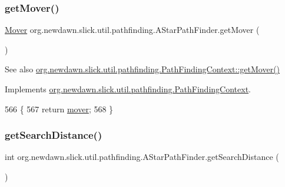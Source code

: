 \subsubsection{\texorpdfstring{get\+Mover()}{getMover()}}
{\footnotesize\ttfamily \mbox{\hyperlink{interfaceorg_1_1newdawn_1_1slick_1_1util_1_1pathfinding_1_1_mover}{Mover}} org.\+newdawn.\+slick.\+util.\+pathfinding.\+A\+Star\+Path\+Finder.\+get\+Mover (\begin{DoxyParamCaption}{ }\end{DoxyParamCaption})\hspace{0.3cm}{\ttfamily [inline]}}

\begin{DoxySeeAlso}{See also}
\mbox{\hyperlink{interfaceorg_1_1newdawn_1_1slick_1_1util_1_1pathfinding_1_1_path_finding_context_a50e439d467ccdf457dca18ca60ab367c}{org.\+newdawn.\+slick.\+util.\+pathfinding.\+Path\+Finding\+Context\+::get\+Mover()}} 
\end{DoxySeeAlso}


Implements \mbox{\hyperlink{interfaceorg_1_1newdawn_1_1slick_1_1util_1_1pathfinding_1_1_path_finding_context_a50e439d467ccdf457dca18ca60ab367c}{org.\+newdawn.\+slick.\+util.\+pathfinding.\+Path\+Finding\+Context}}.


\begin{DoxyCode}
566                             \{
567         \textcolor{keywordflow}{return} \mbox{\hyperlink{classorg_1_1newdawn_1_1slick_1_1util_1_1pathfinding_1_1_a_star_path_finder_a5407fe31e264f03e9d6092bcb18aba4a}{mover}};
568     \}
\end{DoxyCode}
\mbox{\label{classorg_1_1newdawn_1_1slick_1_1util_1_1pathfinding_1_1_a_star_path_finder_abf095f4193d79acc42fdceb293468e14}} 
\subsubsection{\texorpdfstring{get\+Search\+Distance()}{getSearchDistance()}}
{\footnotesize\ttfamily int org.\+newdawn.\+slick.\+util.\+pathfinding.\+A\+Star\+Path\+Finder.\+get\+Search\+Distance (\begin{DoxyParamCaption}{ }\end{DoxyParamCaption})\hspace{0.3cm}{\ttfamily [inline]}}

